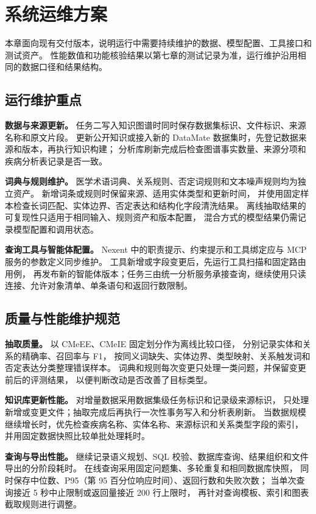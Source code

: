 \chapter{系统运维方案}

本章面向现有交付版本，说明运行中需要持续维护的数据、模型配置、工具接口和测试资产。
性能数值和功能核验结果以第七章的测试记录为准，运行维护沿用相同的数据口径和结果结构。

\section{运行维护重点}

\textbf{数据与来源更新。}
任务二写入知识图谱时同时保存数据集标识、文件标识、来源名称和原文片段。
更新公开知识或接入新的 DataMate 数据集时，先登记数据来源和版本，再执行知识构建；
分析库刷新完成后检查图谱事实数量、来源分项和疾病分析表记录是否一致。

\textbf{词典与规则维护。}
医学术语词典、关系规则、否定词规则和文本噪声规则均为独立资产。
新增词条或规则时保留来源、适用实体类型和更新时间，
并使用固定样本检查长词匹配、实体边界、否定表达和结构化字段清洗结果。
离线抽取结果的可复现性只适用于相同输入、规则资产和版本配置，
混合方式的模型结果仍需记录模型配置和调用状态。

\textbf{查询工具与智能体配置。}
Nexent 中的职责提示、约束提示和工具绑定应与 MCP 服务的参数定义同步维护。
工具新增或字段变更后，先运行工具扫描和固定路由用例，
再发布新的智能体版本；任务三由统一分析服务承接查询，继续使用只读连接、允许对象清单、单条语句和返回行数限制。

\section{质量与性能维护规范}

\textbf{抽取质量。}
以 CMeEE、CMeIE 固定划分作为离线比较口径，
分别记录实体和关系的精确率、召回率与 F1，
按同义词缺失、实体边界、类型映射、关系触发词和否定表达分类整理错误样本。
词典和规则每次变更只处理一类问题，并保留变更前后的评测结果，
以便判断改动是否改善了目标类型。

\textbf{知识库更新性能。}
对增量数据采用数据集级任务标识和记录级来源标识，
只处理新增或变更文件；抽取完成后再执行一次性事务写入和分析表刷新。
当数据规模继续增长时，优先检查疾病名称、实体名称、来源标识和关系类型字段的索引，
并用固定数据快照比较单批处理耗时。

\textbf{查询与导出性能。}
继续记录语义规划、SQL 校验、数据库查询、结果组织和文件导出的分阶段耗时。
在线查询采用固定问题集、多轮重复和相同数据库快照，
同时保存中位数、P95（第 95 百分位响应时间）、返回行数和失败次数；
当单次查询接近 5 秒中止限制或返回量接近 200 行上限时，
再针对查询模板、索引和图表截取规则进行调整。
